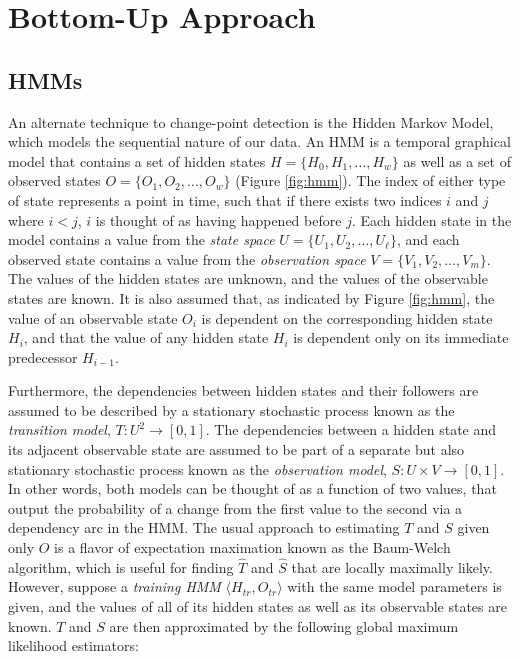 \section{Bottom-Up Approach}
\label{sec:bottomup}

\subsection{HMMs}

An alternate technique to change-point detection is the Hidden Markov Model,
which models the sequential nature of our data. An HMM is a temporal graphical
model that contains a set of hidden states $H = \{H_0,H_1, \ldots, H_w\}$ as
well as a set of
observed states $O = \{O_1,O_2, \ldots, O_w\}$ (Figure \ref{fig:hmm}). The index
of either type of state represents a point in time, such that if there exists
two indices $i$ and $j$ where $i < j$, $i$ is thought of as having happened
before $j$. Each hidden state in the model contains a value from the
\emph{state space} $U=\{U_1,U_2, \ldots, U_{\ell}\}$, and each
observed state contains a value from the \emph{observation space}
$V=\{V_1,V_2, \ldots, V_m\}$.
The values of the hidden states are unknown, and the values of the observable
states are known.
It is also assumed that, as indicated by Figure \ref{fig:hmm}, the
value of an observable state $O_i$ is dependent on the corresponding
hidden state $H_i$, and that the value of any hidden state $H_i$ is dependent only on
its immediate predecessor $H_{i-1}$.

Furthermore, the dependencies between hidden states and their followers are
assumed to be described by a stationary stochastic process known as the
\emph{transition model}, \mbox{$T: U^2 \rightarrow [0,1]$}. The dependencies
between a hidden state and its adjacent observable state are assumed to be part
of a separate but also stationary stochastic process known as the
\emph{observation model}, $S: U \times V \rightarrow [0,1]$. In other words,
both models can be thought of as a function of two values, that output the
probability of a change from the first value to the second via a dependency
arc in the HMM. The usual approach to estimating $T$ and $S$ given only
$O$ is a flavor of expectation maximation known as the Baum-Welch algorithm,
which is useful for finding $\hat{T}$ and $\hat{S}$ that are locally maximally
likely. However, suppose a \emph{training HMM} $\langle H_{tr},O_{tr} \rangle$
with the same model parameters is given, and the values of all of its hidden states as well as its
observable states are known. $T$ and $S$ are then approximated by the
following global maximum likelihood estimators:

